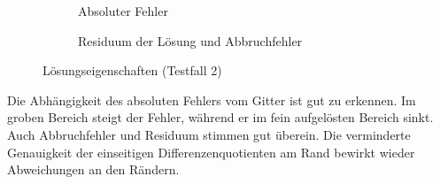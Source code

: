 \begin{figure}[ht]
\centering
   \begin{subfigure}{0.49\linewidth} \centering
     \caption{Absoluter Fehler}
   \end{subfigure}
   \begin{subfigure}{0.49\linewidth} \centering
  \caption{Residuum der Lösung und Abbruchfehler}
   \end{subfigure}
   \caption{Lösungseigenschaften (Testfall 2)}
\end{figure}
Die Abhängigkeit des absoluten Fehlers vom Gitter ist gut zu erkennen. Im groben
Bereich steigt der Fehler, während er im fein aufgelösten Bereich sinkt.
Auch Abbruchfehler und Residuum stimmen gut überein. Die verminderte Genauigkeit
der einseitigen Differenzenquotienten am Rand bewirkt wieder Abweichungen an den Rändern.
